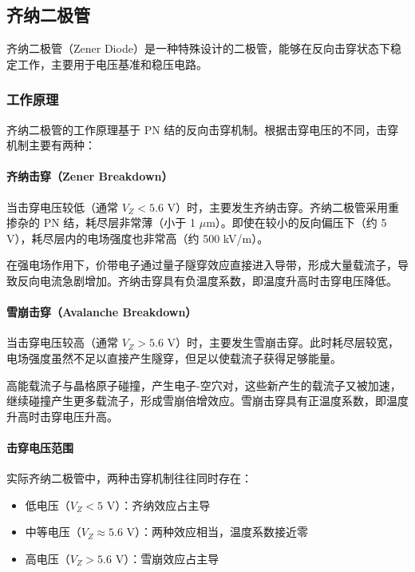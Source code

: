 \subsection{齐纳二极管}

齐纳二极管（Zener Diode）是一种特殊设计的二极管，能够在反向击穿状态下稳定工作，主要用于电压基准和稳压电路。

\subsubsection{工作原理}

齐纳二极管的工作原理基于 PN 结的反向击穿机制。根据击穿电压的不同，击穿机制主要有两种：

\paragraph{齐纳击穿（Zener Breakdown）}

当击穿电压较低（通常 $V_Z < 5.6$ V）时，主要发生齐纳击穿。齐纳二极管采用重掺杂的 PN 结，耗尽层非常薄（小于 1 $\mu$m）。即使在较小的反向偏压下（约 5 V），耗尽层内的电场强度也非常高（约 500 kV/m）。

在强电场作用下，价带电子通过量子隧穿效应直接进入导带，形成大量载流子，导致反向电流急剧增加。齐纳击穿具有负温度系数，即温度升高时击穿电压降低。

\paragraph{雪崩击穿（Avalanche Breakdown）}

当击穿电压较高（通常 $V_Z > 5.6$ V）时，主要发生雪崩击穿。此时耗尽层较宽，电场强度虽然不足以直接产生隧穿，但足以使载流子获得足够能量。

高能载流子与晶格原子碰撞，产生电子-空穴对，这些新产生的载流子又被加速，继续碰撞产生更多载流子，形成雪崩倍增效应。雪崩击穿具有正温度系数，即温度升高时击穿电压升高。

\paragraph{击穿电压范围}

实际齐纳二极管中，两种击穿机制往往同时存在：
\begin{itemize}
  \item 低电压（$V_Z < 5$ V）：齐纳效应占主导
  \item 中等电压（$V_Z \approx 5.6$ V）：两种效应相当，温度系数接近零
  \item 高电压（$V_Z > 5.6$ V）：雪崩效应占主导
\end{itemize}

